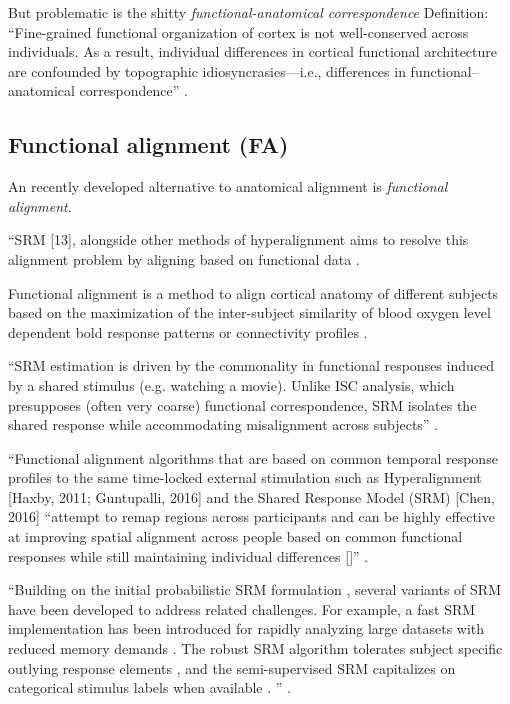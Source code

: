 But problematic is the shitty \textit{functional-anatomical correspondence}
Definition: ``Fine-grained functional organization of cortex is not
well-conserved across individuals. As a result, individual differences in
cortical functional architecture are confounded by topographic
idiosyncrasies—i.e., differences in functional–anatomical correspondence''
\citep{feilong2018reliable}.


\subsection{Functional alignment (FA)}


An recently developed alternative to anatomical alignment is \textit{functional
alignment}.

``SRM [13], alongside other methods of hyperalignment \citep{haxby2011common,
haxby2020hyperalignment, bazeille2019local} aims to resolve this alignment
problem by aligning based on functional data \citep{kumar2020brainiak}.

%
Functional alignment is a method to align cortical anatomy of different subjects
based on the maximization of the inter-subject similarity of blood oxygen level
dependent \ac{bold} response patterns \citep{haxby2011common, chen2015reduced,
sabuncu2010function} or connectivity profiles \citep{feilong2018reliable,
guntupalli2018computational}.

%
``SRM estimation is driven by the commonality in functional responses induced by
a shared stimulus (e.g. watching a movie). Unlike ISC analysis, which
presupposes (often very coarse) functional correspondence, SRM isolates the
shared response while accommodating misalignment across subjects''
\citep{kumar2020brainiak}.

%
``Functional alignment algorithms that are based on common temporal response
profiles to the same time-locked external stimulation such as Hyperalignment
[Haxby, 2011; Guntupalli, 2016] and the Shared Response Model (SRM) [Chen, 2016]
``attempt to remap regions across participants and can be highly effective at
improving spatial alignment across people based on common functional responses
while still maintaining individual differences [\citep{feilong2018reliable}]''
\citep{chang2021endogenous}.

%
``Building on the initial probabilistic SRM formulation \citep{chen2015reduced,
anderson2016enabling}, several variants of SRM have been developed to address
related challenges. For example, a fast SRM implementation has been introduced
for rapidly analyzing large datasets with reduced memory demands
\citep{richard2019fast}. The robust SRM algorithm tolerates subject specific
outlying response elements \citep{turek2018capturing}, and the semi-supervised
SRM capitalizes on categorical stimulus labels when available
\citep{turek2017semi}. '' \citep{kumar2020brainiak}.


